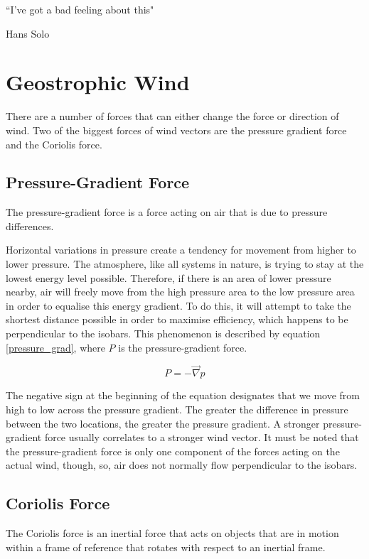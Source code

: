 \epigraph{``I've got a bad feeling about this"}{Hans Solo}

\section{Geostrophic Wind}\label{geostrophic_wind}
There are a number of forces that can either change the force or direction of wind. Two of the biggest forces of wind vectors are the pressure gradient force and the Coriolis force.

\subsection{Pressure-Gradient Force}
\begin{definition}
The pressure-gradient force is a force acting on air that is due to pressure differences.
\end{definition}

Horizontal variations in pressure create a tendency for movement from higher to lower pressure. The atmosphere, like all systems in nature, is trying to stay at the lowest energy level possible. Therefore, if there is an area of lower pressure nearby, air will freely move from the high pressure area to the low pressure area in order to equalise this energy gradient. To do this, it will attempt to take the shortest distance possible in order to maximise efficiency, which happens to be perpendicular to the isobars\cite{pressuregrad_def}. This phenomenon is described by equation \ref{pressure_grad}, where $P$ is the pressure-gradient force.

\begin{equation}
    \label{pressure_grad}
    P = - \Vec{\nabla} p
\end{equation}

The negative sign at the beginning of the equation designates that we move from high to low across the pressure gradient. The greater the difference in pressure between the two locations, the greater the pressure gradient. A stronger pressure-gradient force usually correlates to a stronger wind vector. It must be noted that the pressure-gradient force is only one component of the forces acting on the actual wind, though, so, air does not normally flow perpendicular to the isobars\cite{pressure_grad}.

\subsection{Coriolis Force}
\begin{definition}
The Coriolis force is an inertial force that acts on objects that are in motion within a frame of reference that rotates with respect to an inertial frame.
\end{definition}

